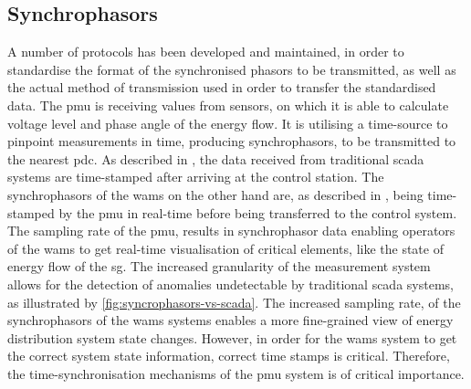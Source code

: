\subsection{Synchrophasors}

A number of protocols has been developed and maintained, in order to standardise the format of the synchronised phasors to be transmitted, as well as the actual method of transmission used in order to transfer the standardised data.
The \acrshort{pmu} is receiving values from sensors, on which it is able to calculate voltage level and phase angle of the energy flow. It is utilising a time-source to pinpoint measurements in time, producing synchrophasors, to be transmitted to the nearest \acrshort{pdc}. 
As described in \cite{dagle2019importance}, the data received from traditional \acrshort{scada} systems are time-stamped after arriving at the control station. The synchrophasors of the \acrshort{wams} on the other hand are, as described in \cite{ali2016wide}, being time-stamped by the \acrshort{pmu} in real-time before being transferred to the control system. The sampling rate of the \acrshort{pmu}, results in synchrophasor data enabling operators of the \acrshort{wams} to get real-time visualisation of critical elements, like the state of energy flow  of the \acrlong{sg}. The increased granularity of the measurement system allows for the detection of anomalies undetectable by traditional \acrshort{scada} systems, as illustrated by \figureautorefname { }\ref{fig:syncrophasors-vs-scada}. 
The increased sampling rate, of the synchrophasors of the \acrshort{wams} systems enables a more fine-grained view of energy distribution system state changes. However, in order for the \acrshort{wams} system to get the correct system state information, correct time stamps is critical. 
Therefore, the time-synchronisation mechanisms of the \acrshort{pmu} system is of critical importance. \\ 

\begin{figure}
\end{figure}  



